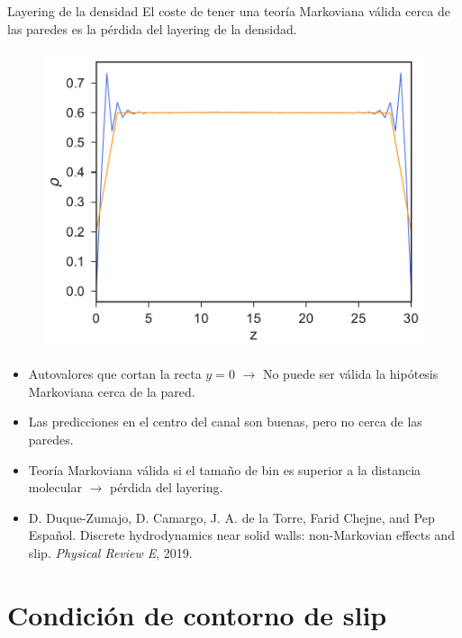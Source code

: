 \documentclass{beamer}
\begin{document}
\begin{frame}{Layering de la densidad}
  El coste de tener una teoría Markoviana válida cerca de las paredes es la pérdida del layering de la densidad. 
\begin{figure}[h!]
\includegraphics[width=0.6\linewidth]{DensityProfile-WALLS}
\end{figure}
\end{frame}

\begin{frame}
  \begin{itemize}
    \item<1-> Autovalores que cortan la recta $y=0$ $\rightarrow$ No puede ser válida la hipótesis Markoviana cerca de la pared.
    \item<2-> Las predicciones en el centro del canal son buenas, pero no cerca de las paredes. 
    \item<3-> Teoría Markoviana válida si el tamaño de bin es superior a la distancia molecular $\rightarrow$ \alert{pérdida del layering}. 
  \item<4-> D. Duque-Zumajo, D. Camargo, J. A. de la Torre, Farid Chejne, and Pep Espa\~nol. Discrete hydrodynamics near solid walls: non-Markovian effects and slip. \textit{Physical Review E}, 2019. 
  \end{itemize}

\end{frame}







\section{Condición de contorno de slip}
\end{document}
